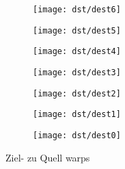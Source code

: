 \begin{figure}[htbp]
	\centering
	\begin{subfigure}[b]{0.12\textwidth}
		\centering
		\texttt{[image: dst/dest6]} %
		\caption{}
	\end{subfigure}
		\begin{subfigure}[b]{0.12\textwidth}
		\centering
		\texttt{[image: dst/dest5]} %
		\caption{}
	\end{subfigure}
		\begin{subfigure}[b]{0.12\textwidth}
		\centering
		\texttt{[image: dst/dest4]} %
		\caption{}
	\end{subfigure}
		\begin{subfigure}[b]{0.12\textwidth}
		\centering
		\texttt{[image: dst/dest3]} %
		\caption{}
	\end{subfigure}
		\begin{subfigure}[b]{0.12\textwidth}
		\centering
		\texttt{[image: dst/dest2]} %
		\caption{}
	\end{subfigure}
		\begin{subfigure}[b]{0.12\textwidth}
		\centering
		\texttt{[image: dst/dest1]} %
		\caption{}
	\end{subfigure}
		\begin{subfigure}[b]{0.12\textwidth}
		\centering
		\texttt{[image: dst/dest0]} %
		\caption{}
	\end{subfigure}
	
	\caption{Ziel- zu Quell warps}
	\label{fig:destinations}
\end{figure}


